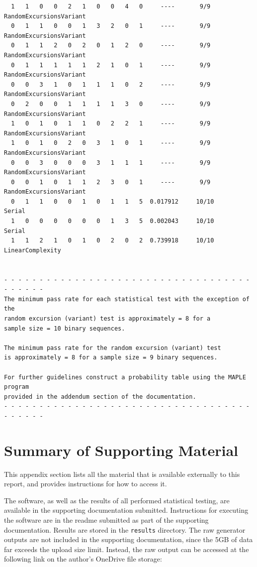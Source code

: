\documentclass[12pt, titlepage]{report}
\theoremstyle{definition}
\begin{document}
{\begin{verbatim}
  1   1   0   0   2   1   0   0   4   0     ----       9/9       RandomExcursionsVariant
  0   1   1   0   0   1   3   2   0   1     ----       9/9       RandomExcursionsVariant
  0   1   1   2   0   2   0   1   2   0     ----       9/9       RandomExcursionsVariant
  0   1   1   1   1   1   2   1   0   1     ----       9/9       RandomExcursionsVariant
  0   0   3   1   0   1   1   1   0   2     ----       9/9       RandomExcursionsVariant
  0   2   0   0   1   1   1   1   3   0     ----       9/9       RandomExcursionsVariant
  1   0   1   0   1   1   0   2   2   1     ----       9/9       RandomExcursionsVariant
  1   0   1   0   2   0   3   1   0   1     ----       9/9       RandomExcursionsVariant
  0   0   3   0   0   0   3   1   1   1     ----       9/9       RandomExcursionsVariant
  0   0   1   0   1   1   2   3   0   1     ----       9/9       RandomExcursionsVariant
  0   1   1   0   0   1   0   1   1   5  0.017912     10/10      Serial
  1   0   0   0   0   0   0   1   3   5  0.002043     10/10      Serial
  1   1   2   1   0   1   0   2   0   2  0.739918     10/10      LinearComplexity


- - - - - - - - - - - - - - - - - - - - - - - - - - - - - - - - - - - - - - - - -
The minimum pass rate for each statistical test with the exception of the
random excursion (variant) test is approximately = 8 for a
sample size = 10 binary sequences.

The minimum pass rate for the random excursion (variant) test
is approximately = 8 for a sample size = 9 binary sequences.

For further guidelines construct a probability table using the MAPLE program
provided in the addendum section of the documentation.
- - - - - - - - - - - - - - - - - - - - - - - - - - - - - - - - - - - - - - - - -
\end{verbatim}


\chapter{Summary of Supporting Material}
This appendix section lists all the material that is available externally to this report, and provides instructions for how to access it.

The software, as well as the results of all performed statistical testing, are available in the supporting documentation submitted. Instructions for executing the software are in the readme submitted as part of the supporting documentation. Results are stored in the \texttt{results} directory. The raw generator outputs are not included in the supporting documentation, since the 5GB of data far exceeds the upload size limit. Instead, the raw output can be accessed at the following link on the author's OneDrive file storage:

}
\end{document}
